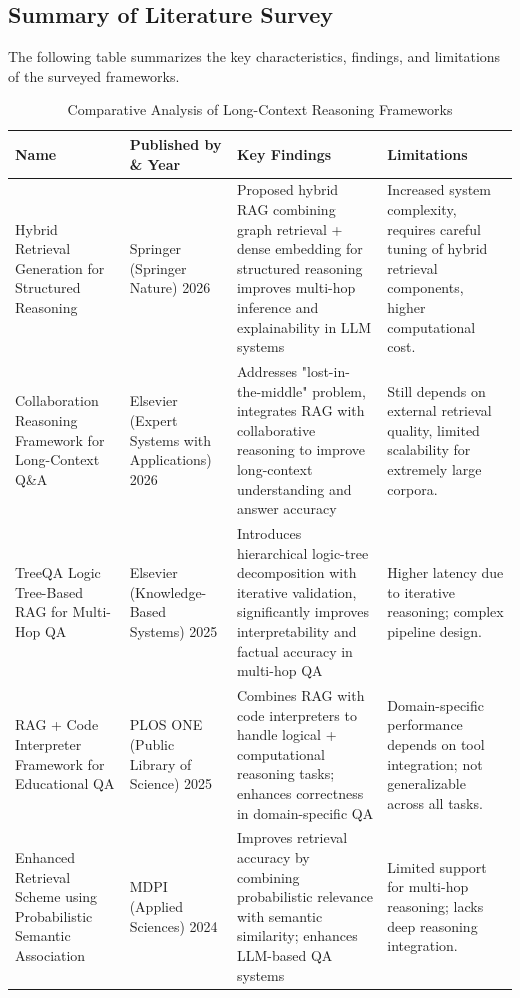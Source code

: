 \subsection*{Summary of Literature Survey}
The following table summarizes the key characteristics, findings, and limitations of the surveyed frameworks.

\begin{table}[H]
	\centering
	\small %
	\caption{Comparative Analysis of Long-Context Reasoning Frameworks}
	\label{tab:literature_comparison}
	\begin{tabular}{|
			>{\raggedright\arraybackslash}p{2.5cm}|
			>{\raggedright\arraybackslash}p{2.2cm}|
			>{\raggedright\arraybackslash}p{5.0cm}|
			>{\raggedright\arraybackslash}p{4.0cm}|}
		\hline
		\textbf{Name} & \textbf{Published by \& Year} & \textbf{Key Findings} & \textbf{Limitations} \\ \hline
		Hybrid Retrieval Generation for Structured Reasoning & Springer (Springer Nature) 2026 & Proposed hybrid RAG combining graph retrieval + dense embedding for structured reasoning improves multi-hop inference and explainability in LLM systems \cite{hybrid2026} & Increased system complexity, requires careful tuning of hybrid retrieval components, higher computational cost. \\ \hline
		Collaboration Reasoning Framework for Long-Context Q\&A & Elsevier (Expert Systems with Applications) 2026 & Addresses "lost-in-the-middle" problem, integrates RAG with collaborative reasoning to improve long-context understanding and answer accuracy \cite{collaboration2026} & Still depends on external retrieval quality, limited scalability for extremely large corpora. \\ \hline
		TreeQA Logic Tree-Based RAG for Multi-Hop QA & Elsevier (Knowledge-Based Systems) 2025 & Introduces hierarchical logic-tree decomposition with iterative validation, significantly improves interpretability and factual accuracy in multi-hop QA \cite{treeqa2025} & Higher latency due to iterative reasoning; complex pipeline design. \\ \hline
		RAG + Code Interpreter Framework for Educational QA & PLOS ONE (Public Library of Science) 2025 & Combines RAG with code interpreters to handle logical + computational reasoning tasks; enhances correctness in domain-specific QA \cite{codeinterpreter2025} & Domain-specific performance depends on tool integration; not generalizable across all tasks. \\ \hline
		Enhanced Retrieval Scheme using Probabilistic Semantic Association & MDPI (Applied Sciences) 2024 & Improves retrieval accuracy by combining probabilistic relevance with semantic similarity; enhances LLM-based QA systems \cite{enhanced2024} & Limited support for multi-hop reasoning; lacks deep reasoning integration. \\ \hline
	\end{tabular}
\end{table}

